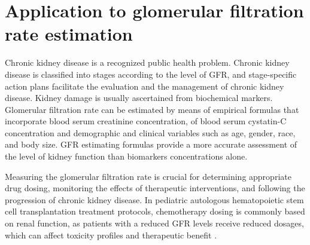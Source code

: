 \documentclass[10pt,final]{siamltex}
\begin{document}
\section{Application to glomerular filtration rate estimation}\label{gfr}
%
Chronic kidney disease is a recognized public health problem. Chronic kidney disease is classified into stages according to the level of GFR, and stage-specific action plans facilitate the evaluation and the management of chronic kidney disease. Kidney damage is usually ascertained from biochemical markers. Glomerular filtration rate can be estimated by means of empirical formulas that incorporate blood serum creatinine concentration, of blood serum cystatin-C concentration and demographic and clinical variables such as age, gender, race, and body size. GFR estimating formulas provide a more accurate assessment of the level of kidney function than biomarkers concentrations alone. %

Measuring the glomerular filtration rate is crucial for determining appropriate drug dosing, monitoring the effects of therapeutic interventions, and following the progression of chronic kidney disease. In pediatric autologous hematopoietic stem cell transplantation treatment protocols, chemotherapy dosing is commonly based on renal function, as patients with a reduced GFR levels receive reduced dosages, which can affect toxicity profiles and therapeutic benefit \cite{laskin}.
%
\end{document}
